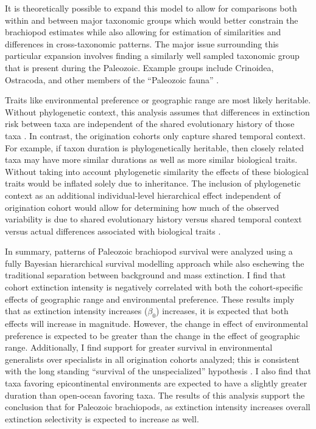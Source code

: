 \documentclass{article}
\begin{document}
It is theoretically possible to expand this model to allow for comparisons both within and between major taxonomic groups which would better constrain the brachiopod estimates while also allowing for estimation of similarities and differences in cross-taxonomic patterns. The major issue surrounding this particular expansion involves finding a similarly well sampled taxonomic group that is present during the Paleozoic. Example groups include Crinoidea, Ostracoda, and other members of the ``Paleozoic fauna'' \citep{Sepkoski1981a}.

Traits like environmental preference or geographic range \citep{Jablonski1987,Hunt2005b} are most likely heritable. Without phylogenetic context, this analysis assumes that differences in extinction risk between taxa are independent of the shared evolutionary history of those  taxa \citep{Felsenstein1985b}. In contrast, the origination cohorts only capture shared temporal context. For example, if taxon duration is phylogenetically heritable, then closely related taxa may have more similar durations as well as more similar biological traits. Without taking into account phylogenetic similarity the effects of these biological traits would be inflated solely due to inheritance. The inclusion of phylogenetic context as an additional individual-level hierarchical effect independent of origination cohort would allow for determining how much of the observed variability is due to shared evolutionary history versus shared temporal context versus actual differences associated with biological traits \citep{Harnik2014,Smits2015}. 


In summary, patterns of Paleozoic brachiopod survival were analyzed using a fully Bayesian hierarchical survival modelling approach while also eschewing the traditional separation between background and mass extinction. I find that cohort extinction intensity is negatively correlated with both the cohort-specific effects of geographic range and environmental preference. These results imply that as extinction intensity increases (\(\beta_{0}\)) increases, it is expected that both effects will increase in magnitude. However, the change in effect of environmental preference is expected to be greater than the change in the effect of geographic range. Additionally, I find support for greater survival in environmental generalists over specialists in all origination cohorts analyzed; this is consistent with the long standing ``survival of the unspecialized'' hypothesis \citep{Liow2004a,Liow2007b,Simpson1944,Simpson1953,Smits2015,Nurnberg2015,Nurnberg2013a, Baumiller1993}. I also find that taxa favoring epicontinental environments are expected to have a slightly greater duration than open-ocean favoring taxa. The results of this analysis support the conclusion that for Paleozoic brachiopods, as extinction intensity increases overall extinction selectivity is expected to increase as well.
\end{document}
